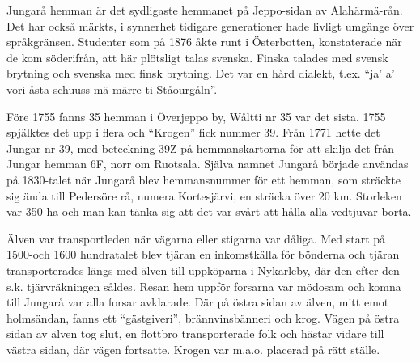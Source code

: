 %

Jungarå hemman är det sydligaste hemmanet på Jeppo-sidan av Alahärmä-rån. Det har också märkts, i synnerhet tidigare generationer hade livligt umgänge över språkgränsen. Studenter som på 1876 åkte runt i Österbotten, konstaterade när de kom söderifrån, att här plötsligt talas svenska. Finska talades med svensk brytning och svenska med finsk brytning. Det var en hård dialekt, t.ex. ``ja’ a’ vori åsta schuuss mä märre ti Ståourgåln''.

Före 1755 fanns 35 hemman i Överjeppo by, Wåltti nr 35 var det sista. 1755 spjälktes det upp i flera och ``Krogen'' fick nummer 39. Från 1771 hette det Jungar nr 39, med beteckning 39Z på hemmanskartorna för att skilja det från Jungar hemman 6F, norr om Ruotsala. Själva namnet Jungarå började användas på 1830-talet när Jungarå blev hemmansnummer för ett hemman, som sträckte sig ända till Pedersöre rå, numera Kortesjärvi, en sträcka över 20 km. Storleken var 350 ha och man kan tänka sig att det var svårt att hålla alla vedtjuvar borta.

Älven var transportleden när vägarna eller stigarna var dåliga. Med start på 1500-och 1600 hundratalet blev tjäran en inkomstkälla för bönderna och tjäran transporterades längs med älven till uppköparna i Nykarleby, där den efter den s.k. tjärvräkningen såldes. Resan hem uppför forsarna var mödosam och komna till Jungarå var alla forsar avklarade. Där på östra sidan av älven, mitt emot holmsändan, fanns ett ``gästgiveri'', brännvinsbänneri och krog. Vägen på östra sidan av älven tog slut, en flottbro transporterade folk och hästar vidare till västra sidan, där vägen fortsatte. Krogen var m.a.o. placerad på rätt ställe.

